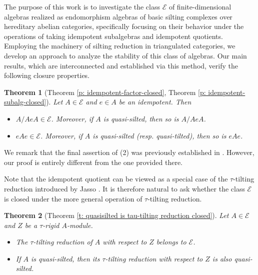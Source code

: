 \documentclass[12pt,a4paper,reqno]{amsart}
\newtheorem{theorem}{Theorem}[section]
\theoremstyle{definition}
\begin{document}
 
The purpose of this work is to investigate the class $\mathcal{E}$ of finite-dimensional algebras realized as endomorphism algebras of basic silting complexes over hereditary abelian categories, specifically focusing on their behavior under the operations of taking idempotent subalgebras and idempotent quotients. Employing the machinery of silting reduction in triangulated categories, we develop an approach to analyze the stability of this class of algebras. Our main results, which are interconnected and established via this method, verify the following closure properties.




\begin{theorem}[Theorem \ref{p: idempotent-factor-closed}, Theorem \ref{p: idempotent-subalg-closed}] \label{t: introduction_1}
Let $A\in \mathcal{E}$ and $e\in A$ be an idempotent. Then
\begin{itemize}
    \item[(1)] $A/AeA\in \mathcal{E}$. Moreover, if $A$ is quasi-silted, then so is $A/AeA$.
    \item[(2)] $eAe\in \mathcal{E}$. Moreover, if $A$ is quasi-silted (resp. quasi-tilted), then so is $eAe$.
\end{itemize}
\end{theorem}
We remark that the final assertion of (2) was previously established in \cite{AC04}. However, our proof is entirely different from the one provided there.



Note that the idempotent quotient can be viewed as a special case of the $\tau$-tilting reduction introduced by Jasso \cite{J}. It is therefore natural to ask whether the class $\mathcal{E}$ is closed under the more general operation of $\tau$-tilting reduction.

\begin{theorem} [Theorem \ref{t: quasisilted is tau-tilting reduction closed}] \label{t: introduction_2}
Let $A\in \mathcal{E}$ and  $Z$ be a $\tau$-rigid $A$-module.
\begin{itemize}
    \item[(1)] The $\tau$-tilting reduction of $A$ with respect to $Z$ belongs to $\mathcal{E}$.
    \item[(2)] If $A$ is quasi-silted, then its $\tau$-tilting reduction with respect to $Z$ is also quasi-silted.
\end{itemize}
\end{theorem}
\end{document}
